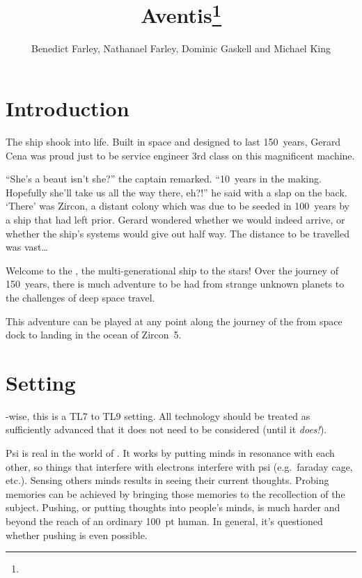 \documentclass[a4paper,twocolumn]{memoir}
\title{Aventis\thanks{\SJGamesOnlinePolicyGameAid{Nathanael Farley}}}
\author{Benedict Farley, Nathanael Farley, Dominic Gaskell and Michael King}
\begin{document}
\maketitle{}

\chapter{Introduction}
{\itshape

  The ship shook into life. Built in space and designed to last 150~years,
  Gerard Cena was proud just to be service engineer 3rd class on this magnificent
  machine.

  ``She's a beaut isn't she?'' the captain remarked. ``10~years in the making.
  Hopefully she'll take us all the way there, eh?!'' he said with a slap on the
  back. `There' was Zircon, a distant colony which was due to be seeded in
  100~years by a ship that had left prior. Gerard wondered whether we would
  indeed arrive, or whether the ship's systems would give out half way. The
  distance to be travelled was vast\ldots{}

}

\bigskip

Welcome to the \aventis, the multi-generational ship to the stars! Over the
journey of 150~years, there is much adventure to be had from strange unknown
planets to the challenges of deep space travel.

This adventure can be played at any point along the journey of the \aventis from
space dock to landing in the ocean of Zircon~5.


\chapter{Setting}

\gurps-wise, this is a TL7 to TL9 setting. All technology should be treated as
sufficiently advanced that it does not need to be considered (until it
\emph{does!}).

Psi is real in the world of \aventis. It works by putting minds in resonance with
each other, so things that interfere with electrons interfere with psi
(e.g.~faraday cage, etc.). Sensing others minds results in seeing their current
thoughts. Probing memories can be achieved by bringing those memories to the
recollection of the subject. Pushing, or putting thoughts into people's minds,
is much harder and beyond the reach of an ordinary 100~pt human. In general,
it's questioned whether pushing is even possible.
\end{document}
